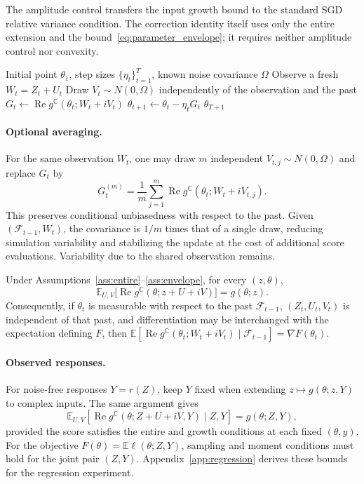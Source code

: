 The amplitude control transfers the input growth bound to the standard
SGD relative variance condition. The correction identity itself uses
only the entire extension and the bound~\eqref{eq:parameter_envelope};
it requires neither amplitude control nor convexity.

\begin{algorithm}[H]
\caption{Complex-Corrected SGD}
\label{alg:ccsgd}
\begin{algorithmic}[1]
\Require Initial point $\theta_1$, step sizes $\{\eta_t\}_{t=1}^T$, known noise covariance $\Omega$
    \State Observe a fresh $W_t=Z_t+U_t$
    \State Draw $V_t\sim N(0,\Omega)$ independently of the observation and the past
    \State $G_t\gets\operatorname{Re}g^{\mathbb C}(\theta_t;W_t+iV_t)$
    \State $\theta_{t+1}\gets\theta_t-\eta_tG_t$
\EndFor
\State \Return $\theta_{T+1}$
\end{algorithmic}
\end{algorithm}

\paragraph{Optional averaging.}
For the same observation $W_t$, one may draw $m$ independent
$V_{t,j}\sim N(0,\Omega)$ and replace $G_t$ by
\[
G_t^{(m)}=\frac1m\sum_{j=1}^m
\operatorname{Re}g^{\mathbb C}(\theta_t;W_t+iV_{t,j}).
\]
This preserves conditional unbiasedness with respect to the past.
Given $(\mathcal F_{t-1},W_t)$, the covariance is $1/m$ times that of
a single draw, reducing simulation variability and stabilizing the update
at the cost of additional score evaluations. Variability due to the
shared observation remains.

\begin{lemma}\label{lem:exact_correction}
Under Assumptions~\ref{ass:entire}--\ref{ass:envelope}, for every $(z,\theta)$,
\[
\mathbb E_{U,V}\bigl[\operatorname{Re}g^{\mathbb C}(\theta;z+U+iV)\bigr]
=g(\theta;z).
\]
Consequently, if $\theta_t$ is measurable with respect to the past $\mathcal F_{t-1}$, $(Z_t,U_t,V_t)$ is independent of that past, and differentiation may be interchanged with the expectation defining $F$, then
$\mathbb E[\operatorname{Re}g^{\mathbb C}(\theta_t;W_t+iV_t)\mid\mathcal F_{t-1}]=\nabla F(\theta_t)$.
\end{lemma}


\paragraph{Observed responses.}
For noise-free responses $Y=r(Z)$, keep $Y$ fixed when extending
$z\mapsto g(\theta;z,Y)$ to complex inputs. The same argument gives
\[
\mathbb E_{U,V}[\operatorname{Re}g^{\mathbb C}(\theta;Z+U+iV,Y)
\mid Z,Y]=g(\theta;Z,Y),
\]
provided the score satisfies the entire and growth conditions at each
fixed $(\theta,y)$. For the objective
$F(\theta)=\mathbb E\ell(\theta;Z,Y)$, sampling and moment conditions
must hold for the joint pair $(Z,Y)$.
Appendix~\ref{app:regression} derives these bounds for the regression
experiment.
